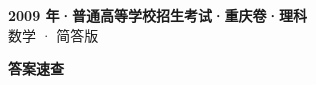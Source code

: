 \documentclass[zihao=-4, a4paper]{ctexart}
\begin{document}
\begin{center}
  {\Large\bfseries 2009 年·普通高等学校招生考试·重庆卷·理科}\\[4pt]
  {\large 数学 · 简答版}
\end{center}
\medskip
{}

\clearpage
{}
\begin{center}{\Large\bfseries 答案速查}\end{center}
\medskip

\end{document}

